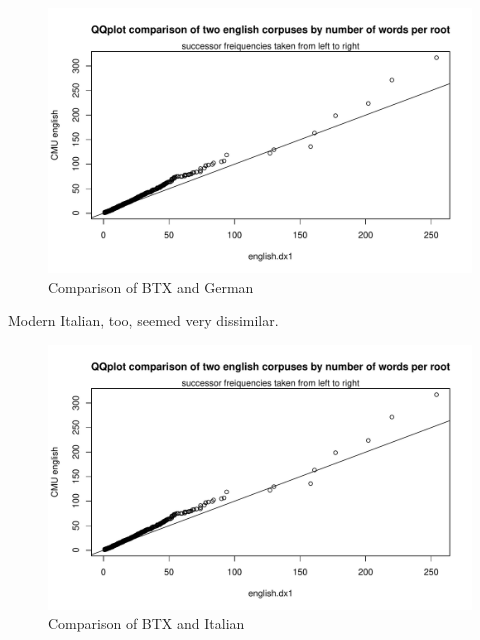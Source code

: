 \documentclass{article}
\begin{document}
		\begin{figure}[H]
		\centering
		\caption{Comparison of BTX and German}
		\includegraphics[scale=.7,page=17]{plots.pdf}
		\end{figure}

Modern Italian, too, seemed very dissimilar. 
		\begin{figure}[H]
		\centering
		\caption{Comparison of BTX and Italian}
		\includegraphics[scale=.7,page=19]{plots.pdf}
		\end{figure}
		
\end{document}

